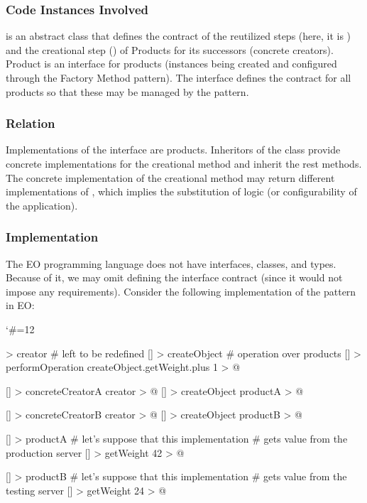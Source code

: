 \documentclass[12pt]{book}
\begin{document}
{{\subsubsection{Code Instances Involved}
 is an abstract class that defines the contract of the reutilized steps (here, it is ) and the creational step () of Products for its successors (concrete creators).
Product is an interface for products (instances being created and configured through the Factory Method pattern). The interface defines the contract for all products so that these may be managed by the pattern.

\subsubsection{Relation}
Implementations of the  interface are products. Inheritors of the  class provide concrete implementations for the creational method and inherit the rest methods. The concrete implementation of the creational method may return different implementations of , which implies the substitution of logic (or configurability of the application).

\subsubsection{Implementation}
The EO programming language does not have interfaces, classes, and types. Because of it, we may omit defining the  interface contract (since it would not impose any requirements). Consider the following implementation of the pattern in EO:

\catcode`\#=12\relax
{}

\begin{ffcode}
[] > creator
  # left to be redefined
  [] > createObject
  # operation over products
  [] > performOperation
    createObject.getWeight.plus 1 > @

[] > concreteCreatorA
  creator > @
  [] > createObject
    productA > @

[] > concreteCreatorB
  creator > @
  [] > createObject
    productB > @

[] > productA
  # let's suppose that this implementation
  # gets value from the production server
  [] > getWeight
    42 > @

[] > productB
  # let's suppose that this implementation
  # gets value from the testing server
  [] > getWeight
          24 > @
\end{ffcode}

}}
\end{document}
